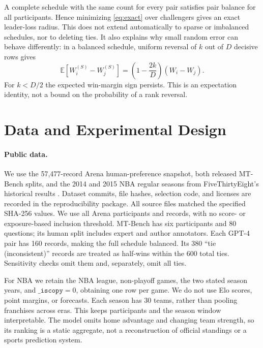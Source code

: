 \documentclass{article}
\begin{document}
A complete schedule with the same count for every pair satisfies pair balance for all participants. Hence minimizing \cref{eq:exact} over challengers gives an exact leader-loss radius. This does not extend automatically to sparse or imbalanced schedules, nor to deleting ties. It also explains why small random error can behave differently: in a balanced schedule, uniform reversal of $k$ out of $D$ decisive rows gives
\begin{equation}\label{eq:expect}
 \mathbb E[W_i^{(S)}-W_j^{(S)}]
 =\left(1-\frac{2k}{D}\right)(W_i-W_j).
\end{equation}
For $k<D/2$ the expected win-margin sign persists. This is an expectation identity, not a bound on the probability of a rank reversal.

\section{Data and Experimental Design}
\begin{table}[t]
\caption{Fixed snapshots and original top-two score gaps. Intervals are percentile intervals from 1,000 cluster bootstrap refits of the \emph{fixed original pair}; ``Top kept'' is the resampling frequency of retaining the original leader. Cluster definitions differ across datasets and do not eliminate all dependence.}
\label{tab:data}
\centering\small
\end{table}

\paragraph{Public data.}
We use the 57,477-record Arena human-preference snapshot, both released MT-Bench splits, and the 2014 and 2015 NBA regular seasons from FiveThirtyEight's historical results \citep{nba}. Dataset commits, file hashes, selection code, and licenses are recorded in the reproducibility package. All source files matched the specified SHA-256 values. We use all Arena participants and records, with no score- or exposure-based inclusion threshold. MT-Bench has six participants and 80 questions; its human split includes expert and author annotators. Each GPT-4 pair has 160 records, making the full schedule balanced. Its 380 ``tie (inconsistent)'' records are treated as half-wins within the 600 total ties. Sensitivity checks omit them and, separately, omit all ties.

For NBA we retain the NBA league, non-playoff games, the two stated season years, and $\texttt{\_iscopy}=0$, obtaining one row per game. We do not use Elo scores, point margins, or forecasts. Each season has 30 teams, rather than pooling franchises across eras. This keeps participants and the season window interpretable. The model omits home advantage and changing team strength, so its ranking is a static aggregate, not a reconstruction of official standings or a sports prediction system.
\end{document}
